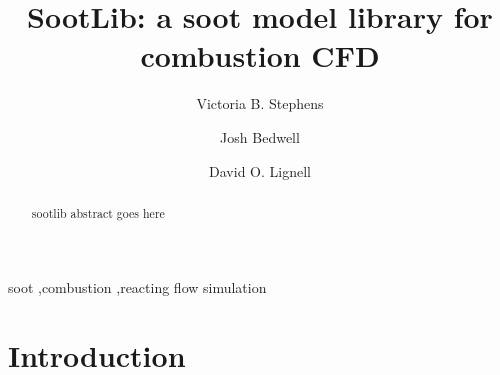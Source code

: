 \documentclass[preprint,letterpaper]{elsarticle}
\begin{document}
\begin{frontmatter}



\title{SootLib: a soot model library for combustion CFD}


\author{Victoria B. Stephens}
\author{Josh Bedwell}
\author{David O. Lignell}


\address{Chemical Engineering Department, Brigham Young University, Provo, UT 84602, USA}

\begin{abstract}
sootlib abstract goes here
\end{abstract}

\begin{keyword}
soot \sep combustion \sep reacting flow simulation
\end{keyword}

\end{frontmatter}

\linenumbers



\section{Introduction}
\label{s:intro}
\end{document}
